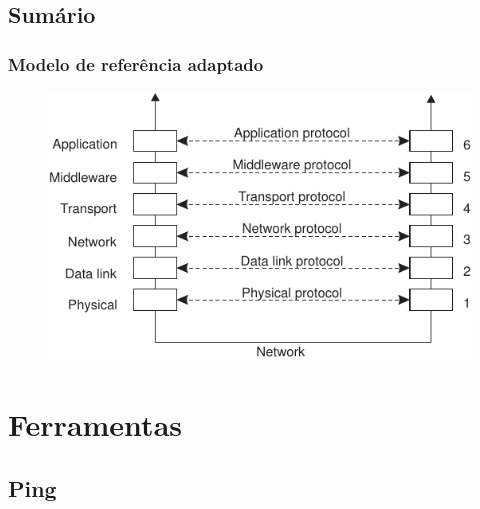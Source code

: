 \documentclass[xcolor=dvipsnames,10pt,compress,aspectratio=169]{beamer}
\begin{document}
\subsection{Sumário}

\begin{frame}
  \frametitle{Modelo de referência adaptado}
  \begin{figure}[ht]
  \centering
  \includegraphics[scale=1]{04-03}
  \end{figure}
\end{frame}

\section{Ferramentas}

\subsection{Ping}
\end{document}
